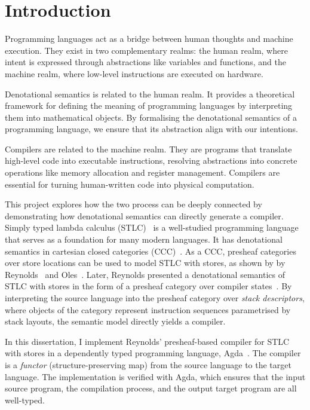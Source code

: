 \documentclass[12pt,a4paper]{report}
\theoremstyle{definition}
\newcommand{\frontmatter}{
  \pagenumbering{roman}
}
\newcommand{\mainmatter}{
  \cleardoublepage
  \pagenumbering{arabic}
  \setcounter{page}{1}
}
\begin{document}
\frontmatter
\tableofcontents
\newpage

\mainmatter
\chapter{Introduction}
    Programming languages act as a bridge between human thoughts and machine execution. They exist in two complementary realms: the human realm, where intent is expressed through abstractions like variables and functions, and the machine realm, where low-level instructions are executed on hardware. 

    Denotational semantics is related to the human realm. It provides a theoretical framework for defining the meaning of programming languages by interpreting them into mathematical objects. By formalising the denotational semantics of a programming language, we ensure that its abstraction align with our intentions.

    Compilers are related to the machine realm. They are programs that translate high-level code into executable instructions, resolving abstractions into concrete operations like memory allocation and register management. Compilers are essential for turning human-written code into physical computation.

    This project explores how the two process can be deeply connected by demonstrating how denotational semantics can directly generate a compiler. Simply typed lambda calculus (STLC)~\autocite{stlc} is a well-studied programming language that serves as a foundation for many modern languages. It has denotational semantics in cartesian closed categories (CCC)~\autocite{lambek}. As a CCC, presheaf categories over store locations can be used to model STLC with stores, as shown by by Reynolds~\autocite{essence} and Oles~\autocite{Oles_1,Oles_2}. Later, Reynolds presented a denotational semantics of STLC with stores in the form of a presheaf category over compiler states~\autocite{Reynolds}. By interpreting the source language into the presheaf category over \emph{stack descriptors}, where objects of the category represent instruction sequences parametrised by stack layouts, the semantic model directly yields a compiler. 
    
    In this dissertation, I implement Reynolds' presheaf-based compiler for STLC with stores in a dependently typed programming language, Agda~\autocite{Agda}. The compiler is a \emph{functor} (structure-preserving map) from the source language to the target language. The implementation is verified with Agda, which ensures that the input source program, the compilation process, and the output target program are all well-typed.
\end{document}

